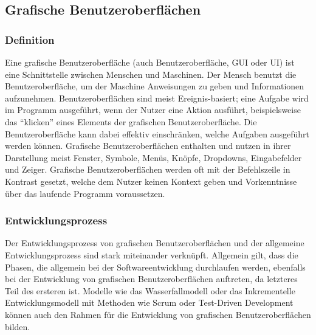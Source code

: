 \documentclass[first=Christoph,last=Hoentzsch,company=Softwareprojekt,location=Dresden,simple, noheader]{baarticle}
\begin{document}
\begin{basimple}
            \newpage
        \subsection{Grafische Benutzeroberflächen}
            \subsubsection{Definition}
            Eine grafische Benutzeroberfläche (auch Benutzeroberfläche, GUI oder UI) ist eine Schnittstelle zwischen Menschen und Maschinen.
            Der Mensch benutzt die Benutzeroberfläche, um der Maschine Anweisungen zu geben und Informationen aufzunehmen.
            Benutzeroberflächen sind meist Ereignis-basiert; eine Aufgabe wird im Programm ausgeführt, wenn der Nutzer eine Aktion ausführt, beispielsweise das \enquote{klicken} eines Elements der grafischen Benutzeroberfläche.
            Die Benutzeroberfläche kann dabei effektiv einschränken, welche Aufgaben ausgeführt werden können.
            Grafische Benutzeroberflächen enthalten und nutzen in ihrer Darstellung meist Fenster, Symbole, Menüs, Knöpfe, Dropdowns, Eingabefelder und Zeiger.
            Grafische Benutzeroberflächen werden oft mit der Befehlszeile in Kontrast gesetzt, welche dem Nutzer keinen Kontext geben und Vorkenntnisse über das laufende Programm voraussetzen.

            \subsubsection{Entwicklungsprozess}
            Der Entwicklungsprozess von grafischen Benutzeroberflächen und der allgemeine Entwicklungsprozess sind stark miteinander verknüpft.
            Allgemein gilt, dass die Phasen, die allgemein bei der Softwareentwicklung durchlaufen werden, ebenfalls bei der Entwicklung von grafischen Benutzeroberflächen auftreten, da letzteres Teil des ersteren ist.
            Modelle wie das Wasserfallmodell oder das Inkrementelle Entwicklungsmodell mit Methoden wie Scrum oder Test-Driven Development können auch den Rahmen für die Entwicklung von grafischen Benutzeroberflächen bilden.
            

\end{basimple}
\end{document}
